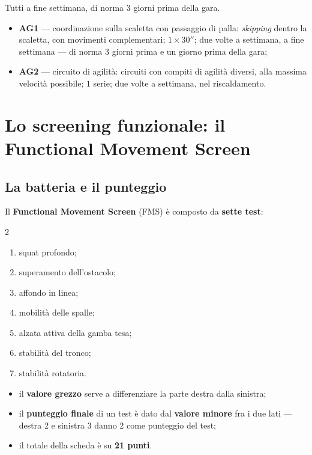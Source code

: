 Tutti a fine settimana, di norma 3 giorni prima della gara.

\begin{itemize}
  \item \textbf{AG1} --- coordinazione sulla scaletta con passaggio di palla: \textit{skipping}
    dentro la scaletta, con movimenti complementari; $1 \times 30''$; due volte a settimana, a fine
    settimana --- di norma 3 giorni prima e un giorno prima della gara;
  \item \textbf{AG2} --- circuito di agilità: circuiti con compiti di agilità diversi, alla massima
    velocità possibile; $1$ serie; due volte a settimana, nel riscaldamento.
\end{itemize}

\section{Lo screening funzionale: il Functional Movement Screen}

\subsection{La batteria e il punteggio}

Il \textbf{Functional Movement Screen} (FMS) è composto da \textbf{sette test}:

\begin{multicols}{2}
\begin{enumerate}
  \item squat profondo;
  \item superamento dell'ostacolo;
  \item affondo in linea;
  \item mobilità delle spalle;
  \item alzata attiva della gamba tesa;
  \item stabilità del tronco;
  \item stabilità rotatoria.
\end{enumerate}
\end{multicols}

\begin{itemize}
  \item il \textbf{valore grezzo} serve a differenziare la parte destra dalla sinistra;
  \item il \textbf{punteggio finale} di un test è dato dal \textbf{valore minore} fra i due lati ---
    destra 2 e sinistra 3 danno 2 come punteggio del test;
  \item il totale della scheda è su \textbf{21 punti}.
\end{itemize}

